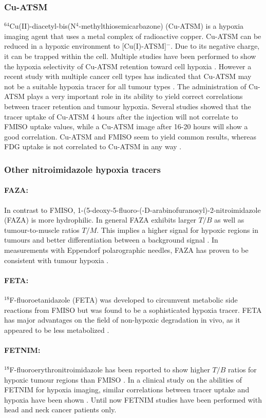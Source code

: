 \subsubsection{Cu-ATSM}
$^{64}$Cu(II)-diacetyl-bis(N$^4$-methylthiosemicarbazone) (Cu-ATSM) is a hypoxia imaging agent that uses a metal complex of radioactive copper. Cu-ATSM can be reduced in a hypoxic environment to [Cu(I)-ATSM]$^-$. Due to its negative charge, it can be trapped within the cell. Multiple studies have been performed to show the hypoxia selectivity of Cu-ATSM retention toward cell hypoxia \cite{pmid9662602}. However a recent study with multiple cancer cell types has indicated that Cu-ATSM may not be a suitable hypoxia tracer for all tumour types \cite{pmid16741309}. The administration of Cu-ATSM plays a very important role in its ability to yield correct correlations between tracer retention and tumour hypoxia. Several studies showed that the tracer uptake of Cu-ATSM 4 hours after the injection will not correlate to FMISO uptake values, while a Cu-ATSM image after 16-20 hours will show a good correlation. Cu-ATSM and FMISO seem to yield common results, whereas FDG uptake is not correlated to Cu-ATSM in any way \cite{pmid12831991}.
\subsubsection{Other nitroimidazole hypoxia tracers}
\paragraph{FAZA: }In contrast to FMISO, 1-(5-deoxy-5-fluoro-(-D-arabinofuranosyl)-2-nitroimidazole (FAZA) is more hydrophilic. In general FAZA exhibits larger $T/B$ as well as tumour-to-muscle ratios $T/M$. This implies a higher signal for hypoxic regions in tumours and better differentiation between a background signal \cite{pmid12745023}. In measurements with Eppendorf polarographic needles, FAZA has proven to be consistent with tumour hypoxia \cite{pmid18313528}.
\paragraph{FETA: }$^{18}$F-fluoroetanidazole (FETA) was developed to circumvent metabolic side reactions from FMISO but was found to be a sophisticated hypoxia tracer. FETA has major advantages on the field of non-hypoxic degradation in vivo, as it appeared to be less metabolized \cite{pmid15150578}.
\paragraph{FETNIM: }$^{18}$F-fluoroerythronitroimidazole has been reported to show higher $T/B$ ratios for hypoxic tumour regions than FMISO \cite{pmid7862981}. In a clinical study on the abilities of FETNIM for hypoxia imaging, similar correlations between tracer uptake and hypoxia have been shown \cite{pmid14722675}. Until now FETNIM studies have been performed with head and neck cancer patients only.
